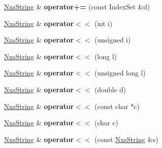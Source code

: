 \begin{DoxyCompactItemize}
\item 
\hypertarget{classNxsString_af2aacc7c8396f1de338100947fc94ea6}{
\hyperlink{classNxsString}{NxsString} \& {\bfseries operator+=} (const IndexSet \&d)}
\label{classNxsString_af2aacc7c8396f1de338100947fc94ea6}

\item 
\hypertarget{classNxsString_adeb755ab28a88ef19e306cecd9298137}{
\hyperlink{classNxsString}{NxsString} \& {\bfseries operator$<$$<$} (int i)}
\label{classNxsString_adeb755ab28a88ef19e306cecd9298137}

\item 
\hypertarget{classNxsString_a34495041b1536df3ff3d3db73c36e3ab}{
\hyperlink{classNxsString}{NxsString} \& {\bfseries operator$<$$<$} (unsigned i)}
\label{classNxsString_a34495041b1536df3ff3d3db73c36e3ab}

\item 
\hypertarget{classNxsString_a6545e80f1893b1eaa0a4c95f4f898698}{
\hyperlink{classNxsString}{NxsString} \& {\bfseries operator$<$$<$} (long l)}
\label{classNxsString_a6545e80f1893b1eaa0a4c95f4f898698}

\item 
\hypertarget{classNxsString_ae4b766e43d2b2849c3f61de8e33f1d8c}{
\hyperlink{classNxsString}{NxsString} \& {\bfseries operator$<$$<$} (unsigned long l)}
\label{classNxsString_ae4b766e43d2b2849c3f61de8e33f1d8c}

\item 
\hypertarget{classNxsString_a0cacd37439646287ea65199347c37a01}{
\hyperlink{classNxsString}{NxsString} \& {\bfseries operator$<$$<$} (double d)}
\label{classNxsString_a0cacd37439646287ea65199347c37a01}

\item 
\hypertarget{classNxsString_ab50f0327a063eec157fe873d5763f0fb}{
\hyperlink{classNxsString}{NxsString} \& {\bfseries operator$<$$<$} (const char $\ast$c)}
\label{classNxsString_ab50f0327a063eec157fe873d5763f0fb}

\item 
\hypertarget{classNxsString_a5eece8c6a8dacc258afd1da2fdc15606}{
\hyperlink{classNxsString}{NxsString} \& {\bfseries operator$<$$<$} (char c)}
\label{classNxsString_a5eece8c6a8dacc258afd1da2fdc15606}

\item 
\hypertarget{classNxsString_aff7e42d574494ca2982e2c8a3f475890}{
\hyperlink{classNxsString}{NxsString} \& {\bfseries operator$<$$<$} (const \hyperlink{classNxsString}{NxsString} \&s)}
\label{classNxsString_aff7e42d574494ca2982e2c8a3f475890}


\end{DoxyCompactItemize}
